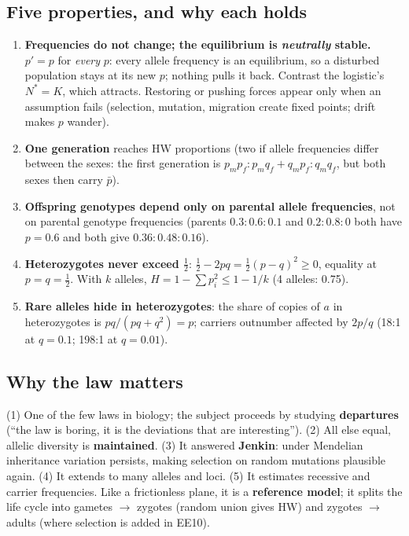 \subsection{Five properties, and why each holds}
\begin{enumerate}
\item \textbf{Frequencies do not change; the equilibrium is \emph{neutrally} stable.} $p'=p$ for \emph{every} $p$: every
allele frequency is an equilibrium, so a disturbed population stays at its new $p$; nothing pulls it back. Contrast the
logistic's $N^*=K$, which attracts. Restoring or pushing forces appear only when an assumption fails (selection, mutation,
migration create fixed points; drift makes $p$ wander).
\item \textbf{One generation} reaches HW proportions (two if allele frequencies differ between the sexes: the first
generation is $p_mp_f:p_mq_f+q_mp_f:q_mq_f$, but both sexes then carry $\bar p$).
\item \textbf{Offspring genotypes depend only on parental allele frequencies}, not on parental genotype frequencies
(parents $0.3:0.6:0.1$ and $0.2:0.8:0$ both have $p=0.6$ and both give $0.36:0.48:0.16$).
\item \textbf{Heterozygotes never exceed $\tfrac12$}: $\tfrac12-2pq=\tfrac12(p-q)^2\ge0$, equality at $p=q=\tfrac12$. With $k$
alleles, $H=1-\sum p_i^2\le1-1/k$ (4 alleles: 0.75).
\item \textbf{Rare alleles hide in heterozygotes}: the share of copies of $a$ in heterozygotes is $pq/(pq+q^2)=p$;
carriers outnumber affected by $2p/q$ (18:1 at $q=0.1$; 198:1 at $q=0.01$).
\end{enumerate}

\subsection{Why the law matters}
(1) One of the few laws in biology; the subject proceeds by studying \textbf{departures} (``the law is boring, it is the
deviations that are interesting''). (2) All else equal, allelic diversity is \textbf{maintained}. (3) It answered
\textbf{Jenkin}: under Mendelian inheritance variation persists, making selection on random mutations plausible again.
(4) It extends to many alleles and loci. (5) It estimates recessive and carrier frequencies. Like a frictionless plane,
it is a \textbf{reference model}; it splits the life cycle into gametes $\to$ zygotes (random union gives HW) and
zygotes $\to$ adults (where selection is added in EE10).

